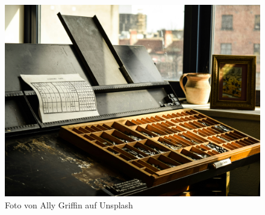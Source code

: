 \documentclass[a4paper]{article}
\begin{document}
\begin{figure}
    \includegraphics[width=\linewidth]{typesetting.jpg}
    \caption{Foto von Ally Griffin auf Unsplash}\label{fig:whateverlabel}
\end{figure}
\end{document}
